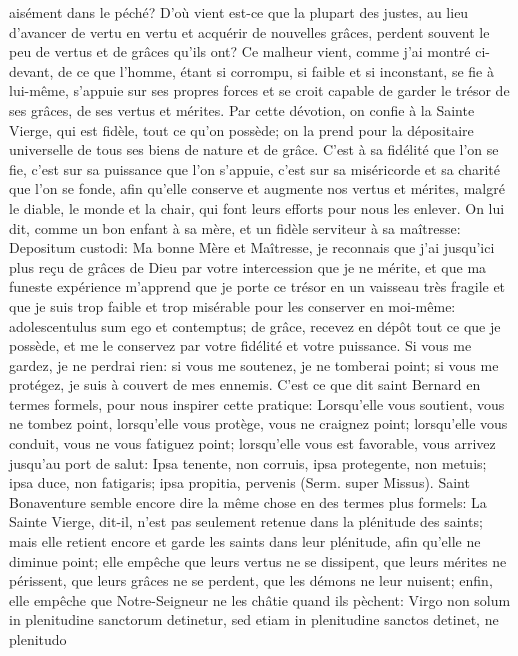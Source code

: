 aisément dans le péché? D'où vient est-ce que la plupart des justes, au lieu d'avancer de vertu en vertu et acquérir
de nouvelles grâces, perdent souvent le peu de vertus et de grâces qu'ils ont? Ce malheur vient, comme j'ai
montré ci-devant, de ce que l'homme, étant si corrompu, si faible et si inconstant, se fie à lui-même, s'appuie sur
ses propres forces et se croit capable de garder le trésor de ses grâces, de ses vertus et mérites. Par cette
dévotion, on confie à la Sainte Vierge, qui est fidèle, tout ce qu'on possède; on la prend pour la dépositaire
universelle de tous ses biens de nature et de grâce. C'est à sa fidélité que l'on se fie, c'est sur sa puissance que
l'on s'appuie, c'est sur sa miséricorde et sa charité que l'on se fonde, afin qu'elle conserve et augmente nos vertus
et mérites, malgré le diable, le monde et la chair, qui font leurs efforts pour nous les enlever. On lui dit, comme un
bon enfant à sa mère, et un fidèle serviteur à sa maîtresse: Depositum custodi: Ma bonne Mère et Maîtresse, je
reconnais que j'ai jusqu'ici plus reçu de grâces de Dieu par votre intercession que je ne mérite, et que ma funeste
expérience m'apprend que je porte ce trésor en un vaisseau très fragile et que je suis trop faible et trop misérable
pour les conserver en moi-même: adolescentulus sum ego et contemptus; de grâce, recevez en dépôt tout ce que
je possède, et me le conservez par votre fidélité et votre puissance. Si vous me gardez, je ne perdrai rien: si vous
me soutenez, je ne tomberai point; si vous me protégez, je suis à couvert de mes ennemis.
 C'est ce que dit saint Bernard en termes formels, pour nous inspirer cette pratique: Lorsqu'elle vous soutient,
vous ne tombez point, lorsqu'elle vous protège, vous ne craignez point; lorsqu'elle vous conduit, vous ne vous
fatiguez point; lorsqu'elle vous est favorable, vous arrivez jusqu'au port de salut: Ipsa tenente, non corruis, ipsa
protegente, non metuis; ipsa duce, non fatigaris; ipsa propitia, pervenis (Serm. super Missus). Saint Bonaventure
semble encore dire la même chose en des termes plus formels: La Sainte Vierge, dit-il, n'est pas seulement
retenue dans la plénitude des saints; mais elle retient encore et garde les saints dans leur plénitude, afin qu'elle ne
diminue point; elle empêche que leurs vertus ne se dissipent, que leurs mérites ne périssent, que leurs grâces ne
se perdent, que les démons ne leur nuisent; enfin, elle empêche que Notre-Seigneur ne les châtie quand ils
pèchent: Virgo non solum in plenitudine sanctorum detinetur, sed etiam in plenitudine sanctos detinet, ne plenitudo

